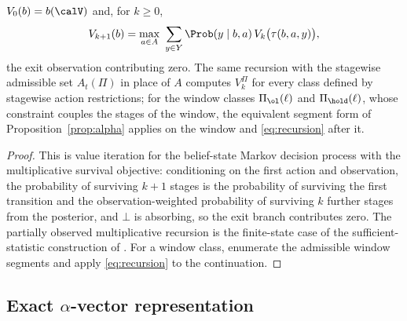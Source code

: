 \begin{proposition}\label{prop:recursion}
$V_0(b)=b(\calV)$ and, for $k\ge0$,
\begin{equation}\label{eq:recursion}
V_{k+1}(b)=\max_{a\in A}\ \sum_{y\in Y}\Prob(y\mid b,a)\,V_{k}\bigl(\tau(b,a,y)\bigr),
\end{equation}
the exit observation contributing zero. The same recursion with the stagewise admissible set $A_t(\Pi)$ in place of $A$ computes $V^{\Pi}_k$ for every class defined by stagewise action restrictions; for the window classes $\Pi_{\ol}(\ell)$ and $\Pi_{\hold}(\ell)$, whose constraint couples the stages of the window, the equivalent segment form of Proposition~\ref{prop:alpha} applies on the window and \eqref{eq:recursion} after it.
\end{proposition}

\begin{proof}
This is value iteration for the belief-state Markov decision process \cite{Astrom1965,SmallwoodSondik1973,BertsekasShreve1978} with the multiplicative survival objective: conditioning on the first action and observation, the probability of surviving $k+1$ stages is the probability of surviving the first transition and the observation-weighted probability of surviving $k$ further stages from the posterior, and $\bot$ is absorbing, so the exit branch contributes zero. The partially observed multiplicative recursion is the finite-state case of the sufficient-statistic construction of \cite{LesserOishi2014}. For a window class, enumerate the admissible window segments and apply \eqref{eq:recursion} to the continuation.
\end{proof}

\subsection{Exact $\alpha$-vector representation}

